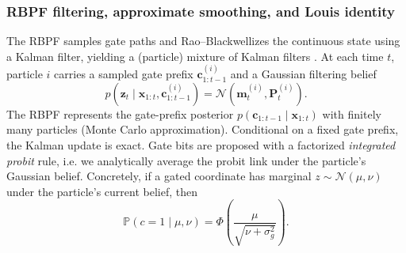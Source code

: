 \documentclass[twoside]{article}
\theoremstyle{plain}
\theoremstyle{definition}
\theoremstyle{remark}
\newcommand{\Io}{\bm{\mathcal{I}}_{\mathrm{obs}}}
\begin{document}
\subsubsection{RBPF filtering, approximate smoothing, and Louis identity}

The RBPF samples gate paths and Rao--Blackwellizes the continuous state using a Kalman filter, yielding a (particle) mixture of Kalman filters \citep{chenliu2000mixturekf}. At each time $t$, particle $i$ carries a sampled gate prefix $\bm c_{1:t-1}^{(i)}$ and a Gaussian filtering belief
\begin{equation}
p(\bm{z}_t\mid \bm{x}_{1:t},\bm{c}_{1:t-1}^{(i)})=\mathcal{N}(\bm{m}_t^{(i)},\bm{P}_t^{(i)}).
\end{equation}
The RBPF represents the gate-prefix posterior $p(\bm c_{1:t-1}\mid \bm x_{1:t})$ with finitely many particles (Monte Carlo approximation). Conditional on a fixed gate prefix, the Kalman update is exact.
Gate bits are proposed with a factorized \emph{integrated probit} rule, i.e. we analytically average the probit link under the particle’s Gaussian belief. Concretely, if a gated coordinate has marginal $z\sim\mathcal{N}(\mu,\nu)$ under the particle’s current belief, then
\begin{equation}
\mathbb{P}(c{=}1\mid \mu,\nu)=\Phi\!\left(\frac{\mu}{\sqrt{\nu+\sigma_g^2}}\right).
\end{equation}
\end{document}
